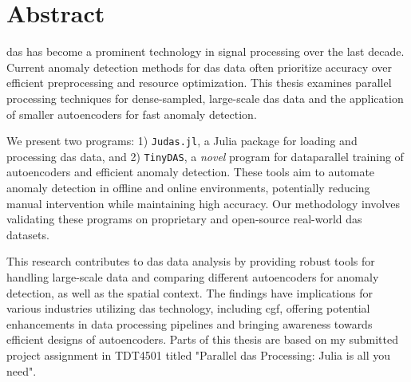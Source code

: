 \chapter*{Abstract}

\acrfull{das} has become a prominent technology in signal processing over the last decade. Current anomaly detection methods for \acrshort{das} data often prioritize accuracy over efficient preprocessing and resource optimization. This thesis examines parallel processing techniques for dense-sampled, large-scale \acrshort{das} data and the application of smaller autoencoders for fast anomaly detection.

We present two programs: 1) \texttt{Judas.jl}, a Julia package for loading and processing \acrshort{das} data, and 2) \texttt{TinyDAS}, a \textit{novel} program for dataparallel training of autoencoders and efficient anomaly detection. These tools aim to automate anomaly detection in offline and online environments, potentially reducing manual intervention while maintaining high accuracy. Our methodology involves validating these programs on proprietary and open-source real-world \acrshort{das} datasets.

This research contributes to \acrshort{das} data analysis by providing robust tools for handling large-scale data and comparing different autoencoders for anomaly detection, as well as the spatial context. The findings have implications for various industries utilizing \acrshort{das} technology, including \acrfull{cgf}, offering potential enhancements in data processing pipelines and bringing awareness towards efficient designs of autoencoders. Parts of this thesis are based on my submitted project assignment in TDT4501 titled "Parallel \acrshort{das} Processing: Julia is all you need".